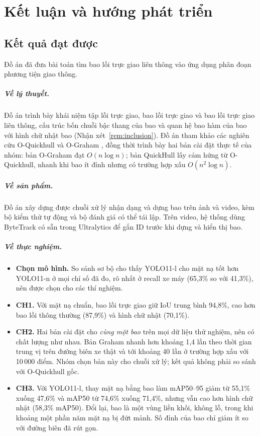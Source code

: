 \chapter{Kết luận và hướng phát triển}
\label{chap:conclusion}

\section{Kết quả đạt được}

Đồ án đã đưa bài toán tìm bao lồi trực giao liên thông vào ứng dụng phân đoạn phương tiện giao thông.

\paragraph{Về lý thuyết.} Đồ án trình bày khái niệm tập lồi trực giao, bao lồi trực giao và bao lồi trực giao liên thông,
cấu trúc bốn chuỗi bậc thang của bao và quan hệ bao hàm của bao với hình chữ nhật bao (Nhận xét~\ref{rem:inclusion}).
Đồ án tham khảo các nghiên cứu O-Quickhull \cite{nguyen2022quickhull} và O-Graham \cite{an2021ograham}, đồng thời trình bày hai bản cài đặt thực tế của nhóm:
bản O-Graham đạt $O(n\log n)$; bản QuickHull lấy cảm hứng từ O-Quickhull, nhanh khi bao ít đỉnh nhưng có trường hợp xấu $O(n^2\log n)$.

\paragraph{Về sản phẩm.} Đồ án xây dựng được chuỗi xử lý nhận dạng và dựng bao trên ảnh và video, kèm bộ kiểm thử tự động và bộ đánh giá có thể tái lập. Trên video, hệ thống dùng ByteTrack có sẵn trong Ultralytics để gắn ID trước khi dựng và hiển thị bao.

\paragraph{Về thực nghiệm.}
\begin{itemize}
  \item \textbf{Chọn mô hình.} So sánh sơ bộ cho thấy YOLO11-l cho mặt nạ tốt hơn YOLO11-n ở mọi chỉ số đã đo, rõ nhất ở recall xe máy (65,3\% so với 41,3\%), nên được chọn cho các thí nghiệm.
  \item \textbf{CH1.} Với mặt nạ chuẩn, bao lồi trực giao giữ IoU trung bình 94,8\%, cao hơn bao lồi thông thường (87,9\%) và hình chữ nhật
        (70,1\%).
  \item \textbf{CH2.} Hai bản cài đặt cho \emph{cùng một bao} trên mọi dữ liệu thử nghiệm, nên có chất lượng như nhau.
        Bản Graham nhanh hơn khoảng 1,4 lần theo thời gian trung vị trên đường biên xe thật và tới khoảng 40 lần ở trường hợp xấu
        với 10\,000 điểm. Nhóm chọn bản này cho chuỗi xử lý; kết quả không phải so sánh với O-Quickhull gốc.
  \item \textbf{CH3.} Với YOLO11-l, thay mặt nạ bằng bao làm mAP50--95 giảm từ 55,1\% xuống 47,6\% và mAP50 từ 74,6\% xuống 71,4\%,
        nhưng vẫn cao hơn hình chữ nhật (58,3\% mAP50). Đổi lại, bao là một vùng liền khối, không lỗ, trong khi khoảng một phần năm mặt nạ bị đứt mảnh.
        Số đỉnh của bao chỉ giảm ít so với đường biên đã rút gọn.
\end{itemize}

